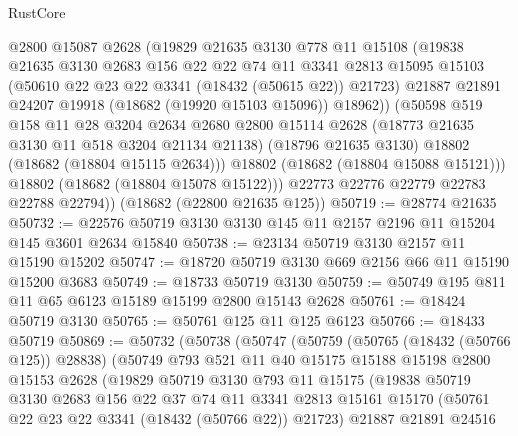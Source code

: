 \begin{lexlean}{RustCore}
\begin{coremodule}
            @2800
            @15087
            @2628
            (@19829
              @21635
              @3130
              @778
              @11
              @15108
              (@19838
                @21635
                @3130
                @2683
                @156
                @22
                @22
                @74
                @11
                @3341
                @2813
                @15095
                @15103
                (@50610 @22 @23 @22 @3341 (@18432 (@50615 @22)) @21723)
                @21887
                @21891
                @24207
                @19918
                (@18682 (@19920 @15103 @15096))
                @18962))
            (@50598
              @519
              @158
              @11
              @28
              @3204
              @2634
              @2680
              @2800
              @15114
              @2628
              (@18773 @21635 @3130 @11 @518 @3204 @21134 @21138)
              (@18796 @21635 @3130)
              @18802
              (@18682 (@18804 @15115 @2634)))
            @18802
            (@18682 (@18804 @15088 @15121)))
          @18802
          (@18682 (@18804 @15078 @15122)))
        @22773
        @22776
        @22779
        @22783
        @22788
        @22794))
    (@18682 (@22800 @21635 @125))
@50719 := @28774 @21635
@50732 := @22576 @50719 @3130 @3130 @145 @11 @2157 @2196 @11 @15204 @145 @3601 @2634 @15840
@50738 := @23134 @50719 @3130 @2157 @11 @15190 @15202
@50747 := @18720 @50719 @3130 @669 @2156 @66 @11 @15190 @15200 @3683
@50749 := @18733 @50719 @3130
@50759 := @50749 @195 @811 @11 @65 @6123 @15189 @15199 @2800 @15143 @2628
@50761 := @18424 @50719 @3130
@50765 := @50761 @125 @11 @125 @6123
@50766 := @18433 @50719
@50869 := @50732
    (@50738
      (@50747
        (@50759
          (@50765 (@18432 (@50766 @125)) @28838)
          (@50749
            @793
            @521
            @11
            @40
            @15175
            @15188
            @15198
            @2800
            @15153
            @2628
            (@19829
              @50719
              @3130
              @793
              @11
              @15175
              (@19838
                @50719
                @3130
                @2683
                @156
                @22
                @37
                @74
                @11
                @3341
                @2813
                @15161
                @15170
                (@50761 @22 @23 @22 @3341 (@18432 (@50766 @22)) @21723)
                @21887
                @21891
                @24516

\end{coremodule}
\end{lexlean}
